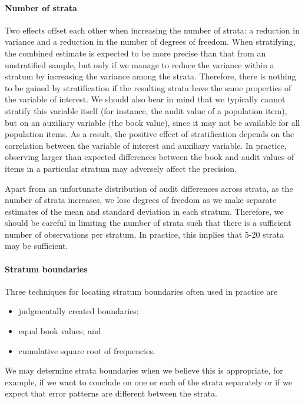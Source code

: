\paragraph{Number of strata}

Two effects offset each other when increasing the number of strata: a reduction in variance and a reduction in the number of degrees of freedom. 
When stratifying, the combined estimate is expected to be more precise than that from an unstratified sample, but only if we manage to reduce the variance within a stratum by increasing the variance among the strata. 
Therefore, there is nothing to be gained by stratification if the resulting strata have the same properties of the variable of interest. 
We should also bear in mind that we typically cannot stratify this variable itself (for instance, the audit value of a population item), but on an auxiliary variable (the book value), since it may not be available for all population items. 
As a result, the positive effect of stratification depends on the correlation between the variable of interest and auxiliary variable. 
In practice, observing larger than expected differences between the book and audit values of items in a particular stratum may adversely affect the precision.

Apart from an unfortunate distribution of audit differences across strata, as the number of strata increases, we lose degrees of freedom as we make separate estimates of the mean and standard deviation in each stratum. Therefore, we should be careful in limiting the number of strata such that there is a sufficient number of observations per stratum. In practice, this implies that 5-20 strata may be sufficient.

\paragraph{Stratum boundaries}

Three techniques for locating stratum boundaries often used in practice are
\begin{itemize}
\item judgmentally created boundaries;
\item equal book values; and
\item cumulative square root of frequencies.
\end{itemize}

We may determine strata boundaries  when we believe this is appropriate, for example, if we want to conclude on one or each of the strata separately or if we expect that error patterns are different between the strata.

